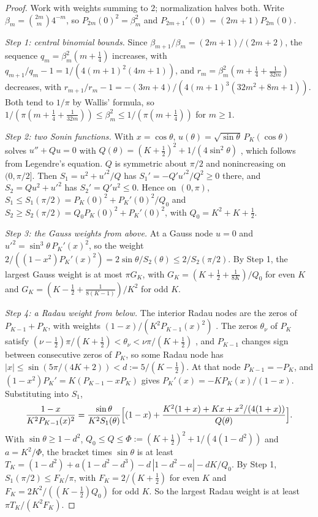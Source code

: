 \documentclass[12pt]{article}
\theoremstyle{definition}
\theoremstyle{remark}
\begin{document}
\begin{proof}
Work with weights summing to $2$; normalization halves both. Write $\beta_m=\binom{2m}m4^{-m}$, so $P_{2m}(0)^2=\beta_m^2$ and $P_{2m+1}'(0)=(2m+1)P_{2m}(0)$.

\emph{Step 1: central binomial bounds.} Since $\beta_{m+1}/\beta_m=(2m+1)/(2m+2)$, the sequence $q_m=\beta_m^2(m+\frac14)$ increases, with $q_{m+1}/q_m-1=1/(4(m+1)^2(4m+1))$, and $r_m=\beta_m^2(m+\frac14+\frac1{32m})$ decreases, with $r_{m+1}/r_m-1=-(3m+4)/(4(m+1)^3(32m^2+8m+1))$. Both tend to $1/\pi$ by Wallis' formula, so $1/(\pi(m+\frac14+\frac1{32m}))\le\beta_m^2\le1/(\pi(m+\frac14))$ for $m\ge1$.

\emph{Step 2: two Sonin functions.} With $x=\cos\theta$, $u(\theta)=\sqrt{\sin\theta}\,P_K(\cos\theta)$ solves $u''+Q u=0$ with $Q(\theta)=(K+\frac12)^2+1/(4\sin^2\theta)$ \citep{szego1975}, which follows from Legendre's equation. $Q$ is symmetric about $\pi/2$ and nonincreasing on $(0,\pi/2]$. Then $S_1=u^2+u'^2/Q$ has $S_1'=-Q'u'^2/Q^2\ge0$ there, and $S_2=Qu^2+u'^2$ has $S_2'=Q'u^2\le0$. Hence on $(0,\pi)$, $S_1\le S_1(\pi/2)=P_K(0)^2+P_K'(0)^2/Q_0$ and $S_2\ge S_2(\pi/2)=Q_0P_K(0)^2+P_K'(0)^2$, with $Q_0=K^2+K+\frac12$.

\emph{Step 3: the Gauss weights from above.} At a Gauss node $u=0$ and $u'^2=\sin^3\theta\,P_K'(x)^2$, so the weight $2/((1-x^2)P_K'(x)^2)=2\sin\theta/S_2(\theta)\le2/S_2(\pi/2)$. By Step 1, the largest Gauss weight is at most $\pi G_K$, with $G_K=(K+\frac12+\frac1{8K})/Q_0$ for even $K$ and $G_K=(K-\frac12+\frac1{8(K-1)})/K^2$ for odd $K$.

\emph{Step 4: a Radau weight from below.} The interior Radau nodes are the zeros of $P_{K-1}+P_K$, with weights $(1-x)/(K^2P_{K-1}(x)^2)$ \citep[25.4.31]{abramowitz1964}. The zeros $\theta_\nu$ of $P_K$ satisfy $(\nu-\frac12)\pi/(K+\frac12)<\theta_\nu<\nu\pi/(K+\frac12)$ \citep[Theorem~6.21.2]{szego1975}, and $P_{K-1}$ changes sign between consecutive zeros of $P_K$, so some Radau node has $|x|\le\sin(5\pi/(4K+2))<d:=5/(K-\frac12)$. At that node $P_{K-1}=-P_K$, and $(1-x^2)P_K'=K(P_{K-1}-xP_K)$ gives $P_K'(x)=-KP_K(x)/(1-x)$. Substituting into $S_1$,
\[
\frac{1-x}{K^2P_{K-1}(x)^2}=\frac{\sin\theta}{K^2S_1(\theta)}\Bigl[(1-x)+\frac{K^2(1+x)+Kx+x^2/(4(1+x))}{Q(\theta)}\Bigr].
\]
With $\sin\theta\ge1-d^2$, $Q_0\le Q\le\Phi:=(K+\frac12)^2+1/(4(1-d^2))$ and $a=K^2/\Phi$, the bracket times $\sin\theta$ is at least $T_K=(1-d^2)+a(1-d^2-d^3)-d\,|1-d^2-a|-dK/Q_0$. By Step 1, $S_1(\pi/2)\le F_K/\pi$, with $F_K=2/(K+\frac12)$ for even $K$ and $F_K=2K^2/((K-\frac12)Q_0)$ for odd $K$. So the largest Radau weight is at least $\pi T_K/(K^2F_K)$.


\end{proof}
\end{document}
